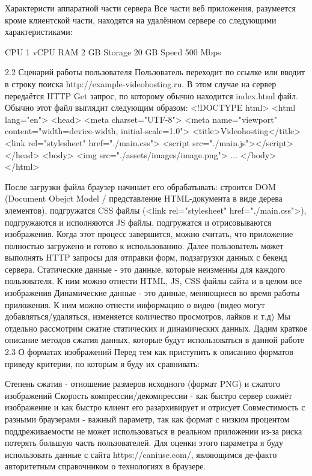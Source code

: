 \documentclass[12pt]{article}
\begin{document}
Характеристи аппаратной части сервера
Все части веб приложения, разумеется кроме клиентской части, находятся на удалённом сервере со следующими характеристиками:

CPU 1 vCPU
RAM 2 GB
Storage 20 GB
Speed 500 Mbps

2.2 Сценарий работы пользователя
Пользователь переходит по ссылке или вводит в строку поиска http://example-videohosting.ru. В этом случае на сервер передаётся HTTP Get запрос, по которому обычно находится index.html файл.
Обычно этот файл выглядит следующим образом:
<!DOCTYPE html>
<html lang="en">
<head>
<meta charset="UTF-8">
<meta name="viewport" content="width=device-width, initial-scale=1.0">
<title>Videohosting</title>
<link rel="stylesheet" href="./main.css">
<script src="./main.js"></script>
</head>
<body>
<img src="./assets/images/image.png">
...
</body>
</html>

После загрузки файла браузер начинает его обрабатывать: строится DOM (Document Obejct Model / представление HTML-документа в виде дерева элементов), подгружатся CSS файлы (<link rel="stylesheet" href="./main.css">), подгружаются и исполняются JS файлы, подгружатся и отрисовываются изображения.
Когда этот процесс завершится, можно считать, что приложение полностью загружено и готово к использованию.
Далее пользователь может выполнять HTTP запросы для отправки форм, подзагрузки данных с бекенд сервера.
Статические данные - это данные, которые неизменны для каждого пользователя. К ним можно отнести HTML, JS, CSS файлы сайта и в целом все изображения
Динамические данные - это данные, меняющиеся во время работы приложения. К ним можно отнести информацию о видео (видео могут добавляться/удаляться, изменяется количество просмотров, лайков и т.д)
Мы отдельно рассмотрим сжатие статических и динамических данных.
Дадим краткое описание методов сжатия данных, которые будут использоваться в данной работе
2.3 О форматах изображений
Перед тем как приступить к описанию форматов приведу критерии, по которым я буду их сравнивать:

Степень сжатия - отношение размеров исходного (формат PNG) и сжатого изображений
Скорость компрессии/декомпрессии - как быстро сервер сожмёт изображение и как быстро клиент его разархивирует и отрисует
Совместимость с разными браузерами - важный параметр, так как формат с низким процентом поддреживаемостм не может использоваться в реальном приложении из-за риска потерять большую часть пользователей. Для оценки этого параметра я буду использовать данные с сайта https://caniuse.com/, являющимся де-факто авторитетным справочником о технологиях в браузере.
\end{document}
